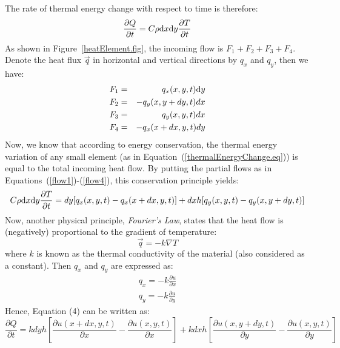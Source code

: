 \documentclass[11pt]{article}
\begin{document}
The rate of thermal energy change with respect to time is therefore:
\begin{equation}\label{thermalEnergyChange.eq}
\frac{\partial Q}{\partial t} = C\rho \mathrm d x \mathrm d y\frac{\partial T}{\partial t}
\end{equation}
As shown in Figure~\ref{heatElement.fig}, the incoming flow is $F_1 + F_2 + F_3 + F_4$. Denote the heat flux $\vec q$ in horizontal and vertical directions by $q_x$ and $q_y$, then we have:
\begin{eqnarray} %
F_1 &=& q_x(x,y,t)\ud y\label{flow1}\\
F_2 &=& -q_y(x,y+dy,t)dx\label{flow2}\\
F_3 &=& q_y(x,y,t)dx\label{flow3}\\
F_4 &=& -q_x(x+dx,y,t)dy\label{flow4}
\end{eqnarray}
Now, we know that according to energy conservation, the thermal energy variation of any small element (as in Equation~(\ref{thermalEnergyChange.eq})) is equal to the total incoming heat flow.  By putting the partial flows as in Equations~(\ref{flow1})-(\ref{flow4}), this conservation principle yields:
\begin{equation}\label{thermalEnergyChange.eq2}
C\rho \mathrm d x \mathrm d y\frac{\partial T}{\partial t} = dy [q_x(x,y,t)-q_x(x+dx,y,t)]+dxh[q_y(x,y,t)-q_y(x,y+dy,t)]
\end{equation}
Now, another physical principle, \emph{Fourier's Law}, states that the heat flow is (negatively) proportional to the gradient of temperature:
\begin{equation}\label{FourierLaw.eq}
\vec q = -k\nabla T
\end{equation}
where $k$ is known as the thermal conductivity of the material (also considered as a constant). Then $q_x$ and $q_y$ are expressed as:
\begin{equation}
\begin{split}
q_x=-k\frac{\partial u}{\partial x}\\
q_y=-k\frac{\partial u}{\partial y}
\end{split}
\end{equation}
Hence, Equation (4) can be written as:
\begin{equation}
\frac{\partial Q}{\partial t}=kdyh[\frac{\partial u(x+dx,y,t)}{\partial x}-\frac{\partial u(x,y,t)}{\partial x}]+kdxh[\frac{\partial u(x,y+dy,t)}{\partial y}-\frac{\partial u(x,y,t)}{\partial y}]
\end{equation}
\end{document}
